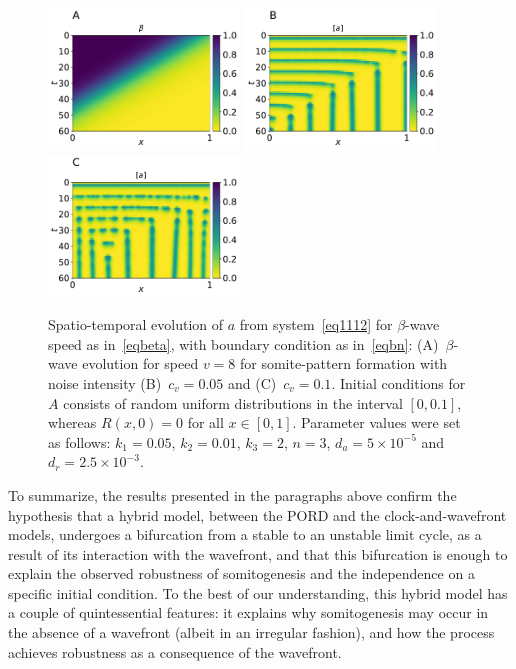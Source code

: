 \documentclass[11pt]{article}
\begin{document}
	\begin{figure}[t!]
		\centering
		\includegraphics[width=2in]{Figures/Fig05aRev.pdf}
		\includegraphics[width=2in]{Figures/Fig05bRev.pdf} 
		\includegraphics[width=2in]{Figures/Fig05cRev.pdf} 
		\caption{Spatio-temporal evolution of $a$ from system~\eqref{eq1112} for
			$\beta$-wave speed as in~\eqref{eqbeta}, with boundary condition as
			in~\eqref{eqbn}: (A)~$\beta$-wave evolution for speed $v=8$ for somite-pattern
			formation with noise intensity (B)~$c_v=0.05$ and (C)~$c_v=0.1$. Initial
			conditions for $A$ consists of random uniform distributions in the interval $[0,
			0.1]$, whereas $R(x, 0) = 0$ for all $x\in[0,1]$. Parameter values were set as
			follows: $k_1=0.05$, $k_2=0.01$, $k_3=2$, $n=3$,  $d_a = 5\times10^{-5}$
			and~$d_r=2.5\times10^{-3}$.}
		\label{Fig05}
	\end{figure}
	
	To summarize, the results presented in the paragraphs above confirm the
	hypothesis that a hybrid model, between the PORD and the clock-and-wavefront 
	models, undergoes a bifurcation from a stable to an 
	unstable limit cycle, as a result of its interaction with the
	wavefront, and
	that this bifurcation is enough to explain the observed robustness of
	somitogenesis and the independence on a specific initial condition. 
	To the best of our understanding, this hybrid model has
	a couple of quintessential features: it explains why somitogenesis may occur in the 
	absence of a wavefront (albeit in an irregular fashion), and how the process 
	achieves robustness as a consequence of the wavefront.
	
\end{document}
